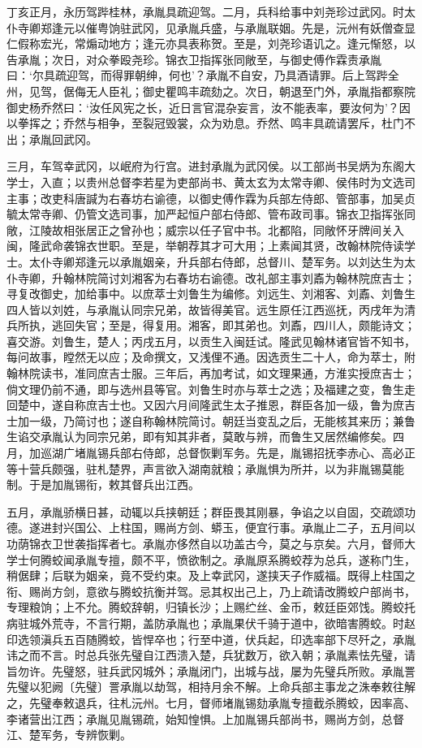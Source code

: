 \documentclass[]{article}
\begin{document}
丁亥正月，永历驾跸桂林，承胤具疏迎驾。二月，兵科给事中刘尧珍过武冈。时太仆寺卿郑逢元以催粤饷驻武冈，见承胤兵盛，与承胤联姻。先是，沅州有妖僧查显仁假称宏光，常煽动地方；逢元亦具表称贺。至是，刘尧珍语讥之。逢元惭怒，以告承胤；次日，对众拳殴尧珍。锦衣卫指挥张同敞至，与御史傅作霖责承胤曰：`尔具疏迎驾，而得罪朝绅，何也'？承胤不自安，乃具酒请罪。后上驾跸全州，见驾，倨侮无人臣礼；御史瞿鸣丰疏劾之。次日，朝退至门外，承胤指都察院御史杨乔然曰：`汝任风宪之长，近日言官混杂妄言，汝不能表率，要汝何为'？因以拳挥之；乔然与相争，至裂冠毁裳，众为劝息。乔然、鸣丰具疏请罢斥，杜门不出；承胤回武冈。

三月，车驾幸武冈，以岷府为行宫。进封承胤为武冈侯。以工部尚书吴炳为东阁大学士，入直；以贵州总督李若星为吏部尚书、黄太玄为太常寺卿、侯伟时为文选司主事；改吏科唐諴为右春坊右谕德，以御史傅作霖为兵部左侍郎、管部事，加吴贞毓太常寺卿、仍管文选司事，加严起恒户部右侍郎、管布政司事。锦衣卫指挥张同敞，江陵故相张居正之曾孙也；威宗以任子官中书。北都陷，同敞怀牙牌间关入闽，隆武命袭锦衣世职。至是，举朝荐其才可大用；上素闻其贤，改翰林院侍读学士。太仆寺卿郑逢元以承胤姻亲，升兵部右侍郎，总督川、楚军务。以刘达生为太仆寺卿，升翰林院简讨刘湘客为右春坊右谕德。改礼部主事刘鼒为翰林院庶吉士；寻复改御史，加给事中。以庶萃士刘鲁生为编修。刘远生、刘湘客、刘鼒、刘鲁生四人皆以刘姓，与承胤认同宗兄弟，故皆得美官。远生原任江西巡抚，丙戌年为清兵所执，逃回失官；至是，得复用。湘客，即其弟也。刘鼒，四川人，颇能诗文；喜交游。刘鲁生，楚人；丙戌五月，以贡生入闽廷试。隆武见翰林诸官皆不知书，每问故事，瞠然无以应；及命撰文，又浅俚不通。因选贡生二十人，命为萃士，附翰林院读书，准同庶吉士服。三年后，再加考试，如文理果通，方淮实授庶吉士；倘文理仍前不通，即与选州县等官。刘鲁生时亦与萃士之选；及福建之变，鲁生走回楚中，遂自称庶吉士也。又因六月间隆武生太子推恩，群臣各加一级，鲁为庶吉士加一级，乃简讨也；遂自称翰林院简讨。朝廷当变乱之后，无能核其来历；兼鲁生谄交承胤认为同宗兄弟，即有知其非者，莫敢与辨，而鲁生又居然编修矣。四月，加巡湖广堵胤锡兵部右侍郎，总督恢剿军务。先是，胤锡招抚李赤心、高必正等十营兵颇强，驻札楚界，声言欲入湖南就粮；承胤惧为所并，以为非胤锡莫能制。于是加胤锡衔，敕其督兵出江西。

五月，承胤骄横日甚，动辄以兵挟朝廷；群臣畏其刚暴，争谄之以自固，交疏颂功德。遂进封兴国公、上柱国，赐尚方剑、蟒玉，便宜行事。承胤止二子，五月间以功荫锦衣卫世袭指挥者七。承胤亦侈然自以功盖古今，莫之与京矣。六月，督师大学士何腾蛟闻承胤专擅，颇不平，愤欲制之。承胤原系腾蛟荐为总兵，遂称门生，稍倨肆；后联为姻亲，竟不受约束。及上幸武冈，遂挟天子作威福。既得上柱国之衔、赐尚方剑，意欲与腾蛟抗衡并驾。忌其权出己上，乃上疏请改腾蛟户部尚书，专理粮饷；上不允。腾蛟辞朝，归镇长沙；上赐纻丝、金币，敕廷臣郊饯。腾蛟托病驻城外荒寺，不言行期，盖防承胤也；承胤果伏千骑于道中，欲暗害腾蛟。时赵印选领滇兵五百随腾蛟，皆悍卒也；行至中道，伏兵起，印选率部下尽歼之，承胤讳之而不言。时总兵张先璧自江西溃入楚，兵犹数万，欲入朝；承胤素怯先璧，请旨勿许。先璧怒，驻兵武冈城外；承胤闭门，出城与战，屡为先璧兵所败。承胤詈先璧以犯阙〔先璧〕詈承胤以劫驾，相持月余不解。上命兵部主事龙之洙奉敕往解之，先璧奉敕退兵，往札沅州。七月，督师堵胤锡劾承胤专擅截杀腾蛟，因率高、李诸营出江西；承胤见胤锡疏，始知惶惧。上加胤锡兵部尚书，赐尚方剑，总督江、楚军务，专辨恢剿。
\end{document}
